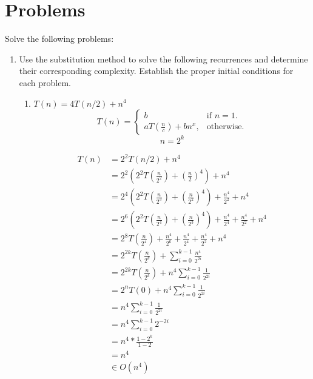 \documentclass{article}
\begin{document}
\section{Problems}
Solve the following problems:
\begin{enumerate}
    \item Use  the  substitution  method  to  solve  the  following  recurrences  and  determine  their  corresponding complexity. Establish the proper initial conditions for each problem.
    \begin{enumerate}
        \item $T(n) = 4T(n/2) +n^4$
        \begin{equation*}
            T(n)=\begin{cases}
              b & \text{if $n = 1$}.\\
              aT(\frac{n}{c}) + bn^x, & \text{otherwise}.
            \end{cases}
        \end{equation*}
        \begin{equation*}
            n = 2^k
        \end{equation*}

        \begin{align*}
            T(n) &= 2^2T(n/2) + n^4\\
            &= 2^2(2^2T(\frac{n}{2^2}) + (\frac{n}{2})^4) + n^4\\
            &= 2^4(2^2T(\frac{n}{2^3}) + (\frac{n}{2^2})^4 )+ \frac{n^4}{2^2} + n^4\\
            &= 2^6(2^2T(\frac{n}{2^4}) + (\frac{n}{2^3})^4)+ \frac{n^4}{2^4} + \frac{n^4}{2^2} + n^4\\
            &= 2^8T(\frac{n}{2^4}) + \frac{n^4}{2^6}+ \frac{n^4}{2^4} + \frac{n^4}{2^2} + n^4\\
            &=2^{2k}T(\frac{n}{2^k}) +\sum^{k -1}_{i=0} \frac{n^4}{2^{2i}}\\
            &=2^{2k}T(\frac{n}{2^k}) +n^4 \sum^{k -1}_{i=0} \frac{1}{2^{2i}}\\
            &=2^{n}T(0) +n^4 \sum^{k -1}_{i=0} \frac{1}{2^{2i}}\\
            &=n^4 \sum^{k -1}_{i=0} \frac{1}{2^{2i}}\\
            &=n^4 \sum^{k -1}_{i=0} 2^{-2i}\\
            &=n^4 * \frac{1-2^k}{1-2}\\
            &=n^4\\
            &\in O(n^4)
        \end{align*}


\end{enumerate}
\end{enumerate}
\end{document}
